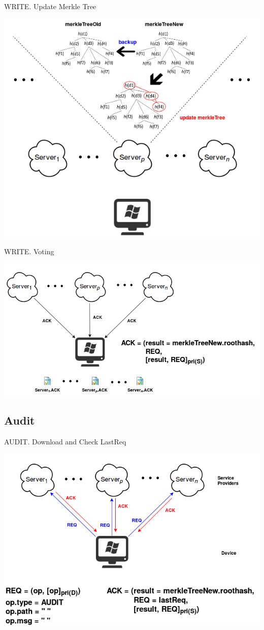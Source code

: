 \documentclass{beamer}
\newcommand{\RNum}[1]{\uppercase\expandafter{\romannumeral #1\relax}}
\begin{document}
\begin{CJK}{UTF8}{bkai}
\begin{frame}{WRITE}{\RNum{2}. Update Merkle Tree}
	\begin{center}
	\includegraphics[width=.65\textwidth]{Write2.png}
	\end{center}
\end{frame}

\begin{frame}{WRITE}{\RNum{3}. Voting}
	\begin{center}
	\includegraphics[width=.85\textwidth]{Write3.png}
	\end{center}
\end{frame}

\subsection{Audit}
\begin{frame}{AUDIT}{\RNum{1}. Download and Check LastReq}
	\begin{center}
	\includegraphics[width=.85\textwidth]{Audit1.png}
	\end{center}
\end{frame}


\end{CJK}
\end{document}
